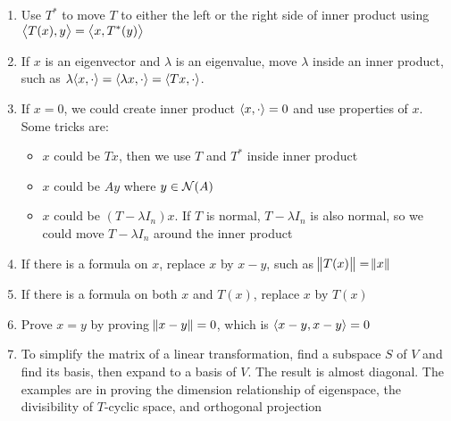 \begin{enumerate}
    \item Use $T^*$ to move $T$ to either the left or the right side of inner product using $\innerproduct{T(x)}{y} = \innerproduct{x}{T^* (y)}$
    \item If $x$ is an eigenvector and $\lambda$ is an eigenvalue, move $\lambda$ inside an inner product, such as $\lambda \innerproduct{x}{\cdot} = \innerproduct{\lambda x}{\cdot} = \innerproduct{Tx}{\cdot}$.
    \item If $x=0$, we could create inner product $\innerproduct{x}{\cdot} = 0$ and use properties of $x$. Some tricks are:
        \begin{itemize}
            \item $x$ could be $Tx$, then we use $T$ and $T^*$ inside inner product
            \item $x$ could be $Ay$ where $y \in \nullspace{A}$
            \item $x$ could be $(T - \lambda I_n)x$. If $T$ is normal, $T-\lambda I_n$ is also normal, so we could move $T-\lambda I_n$ around the inner product
        \end{itemize}
    \item If there is a formula on $x$, replace $x$ by $x-y$, such as $\norm{T(x)} = \norm{x}$
    \item If there is a formula on both $x$ and $T(x)$, replace $x$ by $T(x)$
    \item Prove $x = y$ by proving $\norm{x - y} = 0$, which is $\innerproduct{x - y}{x - y} = 0$
    \item To simplify the matrix of a linear transformation, find a subspace $S$ of $V$ and find its basis, then expand to a basis of $V$. The result is almost diagonal. The examples are in proving the dimension relationship of eigenspace,  the divisibility of $T$-cyclic space, and orthogonal projection
\end{enumerate}

